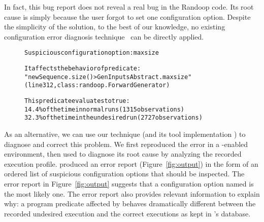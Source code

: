 
In fact, this bug report does not reveal a real bug
in the Randoop code. Its root cause is simply because
the user forgot to set one configuration option.
Despite the simplicity of the solution, to the best of our knowledge, no
existing configuration error diagnosis technique~\cite{Attariyan:2008:UCD, 
Yuan:2011:COC, Su:2009:AGP, Whitaker:2004:CDS, Wang:2004:AMT,
Attariyan:2010:ACT, Rabkin:2011:PPC} can be directly applied.




\begin{figure}[t]
\begin{CodeOut}
\begin{alltt} 
Suspicious configuration option: maxsize

It affects the behavior of predicate:
"newSequence.size() > GenInputsAbstract.maxsize"
(line 312, class: randoop.ForwardGenerator) 

This predicate evaluates to true:
  14.4\% of the time in normal runs (1315 observations)
  32.3\% of the time in the undesired run (2727 observations)

\end{alltt}
\end{CodeOut}
\vspace*{-15pt}
\end{figure}

As an alternative, we can use our technique (and its tool implementation \ourtool)
to diagnose and correct this problem. We first reproduced the
error in a \ourtool-enabled environment, then used \ourtool
to diagnose its root cause by analyzing the recorded execution profile.
\ourtool produced
an error report (Figure~\ref{fig:output}) in the form of an ordered list of
suspicious configuration options that should be inspected.
The error report in Figure~\ref{fig:output} suggests that
a configuration option named
 is the most likely one.
The error report also provides relevant 
information to explain why: %
a program predicate affected by  behaves dramatically
different between the recorded undesired execution
and the correct executions as kept in \ourtool's database.



